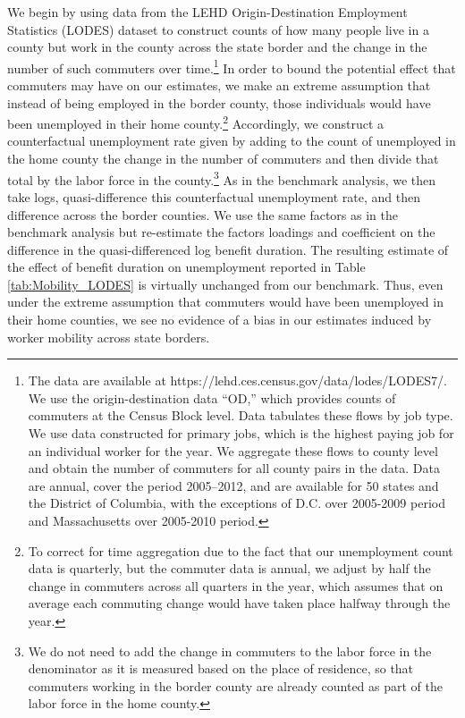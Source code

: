 \documentclass[12pt]{article}
\newcommand{\1}{\mathbf{1}}
\begin{document}
\begin{appendix}
We begin by using data from the LEHD Origin-Destination Employment Statistics (LODES) dataset to construct counts of how many people live in a county but work in the county across the state border and the change in the number of such commuters over time.\footnote{The data are available at https://lehd.ces.census.gov/data/lodes/LODES7/. We use the origin-destination data ``OD,'' which provides counts of commuters at the Census Block level. Data tabulates these flows by job type. We use data constructed for primary jobs, which is the highest paying job for an individual worker for the year. We
aggregate these flows to county level and obtain the number of commuters
for all county pairs in the data. Data are annual, cover the period
2005--2012, and are available for 50 states and the District of Columbia, with the exceptions of D.C. over 2005-2009 period and Massachusetts over 2005-2010 period.} In order to bound the potential effect that commuters may have on our estimates, we make an extreme assumption that instead of being employed in the border county, those individuals would have been unemployed in their home county.\footnote{To correct for time aggregation due to the fact that our unemployment count data is quarterly, but the commuter data is annual, we adjust by half the change in commuters across all quarters in the year, which assumes that on average each commuting change would have taken place halfway through the year.} Accordingly, we construct a counterfactual unemployment rate given by adding to the count of unemployed in the home county the change in the number of commuters and then divide that total by the labor force in the county.\footnote{We do not need to add the change in commuters to the labor force in the denominator as it is measured based on the place of residence, so that commuters working in the border county are already counted as part of the labor force in the home county.} As in the benchmark analysis, we then take logs, quasi-difference this counterfactual unemployment rate, and then difference across the border counties. We use the same factors as in the benchmark analysis but re-estimate the factors loadings and coefficient on the difference in the quasi-differenced log benefit duration. The resulting estimate of the effect of benefit duration on unemployment reported in Table \ref{tab:Mobility_LODES} is virtually unchanged from our benchmark. Thus, even under the extreme assumption that commuters would have been unemployed in their home counties, we see no evidence of a bias in our estimates induced by worker mobility across state borders.



\end{appendix}
\end{document}

